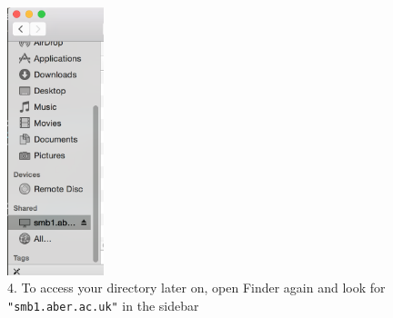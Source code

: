 \documentclass[11pt]{article}
\begin{document}
\begin{figure}[H]
    \includegraphics[width=0.25\textwidth]{images/4.png}
    \caption*{4. To access your directory later on, open Finder again and look for \texttt{"smb1.aber.ac.uk"} in the sidebar}
\end{figure}
\end{document}
